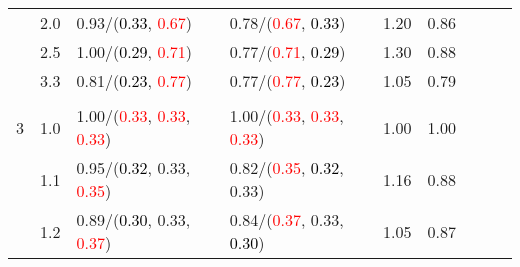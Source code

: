 \documentclass[10pt,a4paper]{report}
\begin{document}
\begin{table}[!htbp]
\begin{center}
{\begin{tabular}{ccllccccc}
				  & 2.0                               & 0.93/(\textcolor{black}{0.33}, \textcolor{red}{0.67})                                                                                           & 0.78/(\textcolor{red}{0.67}, \textcolor{black}{0.33})                                                                                           & 1.20             & 0.86                     \\
				  & 2.5                               & 1.00/(\textcolor{black}{0.29}, \textcolor{red}{0.71})                                                                                           & 0.77/(\textcolor{red}{0.71}, \textcolor{black}{0.29})                                                                                           & 1.30             & 0.88                     \\
				  & 3.3                               & 0.81/(\textcolor{black}{0.23}, \textcolor{red}{0.77})                                                                                           & 0.77/(\textcolor{red}{0.77}, \textcolor{black}{0.23})                                                                                           & 1.05             & 0.79                     \\
				  &                                   &                                                                                                                                                 &                                                                                                                                                 &                                             \\
				3 & 1.0                               & 1.00/(\textcolor{red}{0.33}, \textcolor{red}{0.33}, \textcolor{red}{0.33})                                                                      & 1.00/(\textcolor{red}{0.33}, \textcolor{red}{0.33}, \textcolor{red}{0.33})                                                                      & 1.00             & 1.00                     \\
				  & 1.1                               & 0.95/(\textcolor{black}{0.32}, 0.33, \textcolor{red}{0.35})                                                                                     & 0.82/(\textcolor{red}{0.35}, \textcolor{black}{0.32}, 0.33)                                                                                     & 1.16             & 0.88                     \\
				  & 1.2                               & 0.89/(\textcolor{black}{0.30}, 0.33, \textcolor{red}{0.37})                                                                                     & 0.84/(\textcolor{red}{0.37}, 0.33, \textcolor{black}{0.30})                                                                                     & 1.05             & 0.87                     \\

\end{tabular}}
\end{center}
\end{table}
\end{document}
